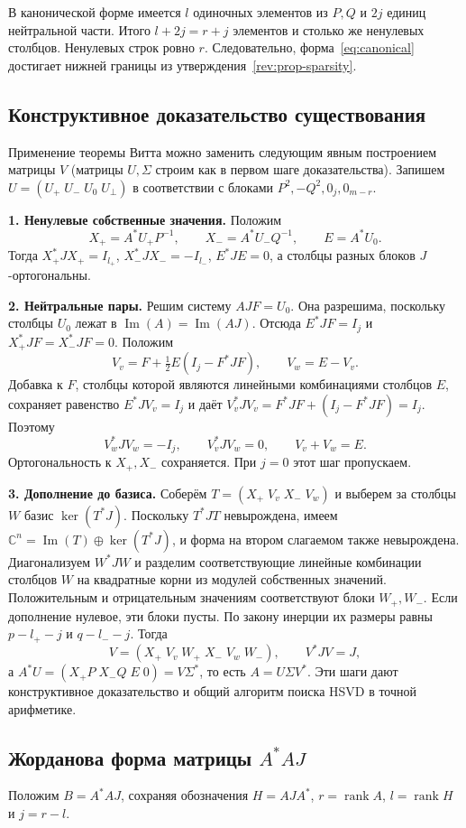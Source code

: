 \documentclass[a4paper,12pt]{article}
\DeclareMathOperator{\rank}{rank}
\theoremstyle{csstyle}
\DeclareMathOperator{\im}{Im}
\newcommand{\HSVDComplex}{\mathbb C}
\begin{document}
В канонической форме имеется $l$ одиночных элементов из $P,Q$ и $2j$
единиц нейтральной части. Итого $l+2j=r+j$ элементов и столько же
ненулевых столбцов. Ненулевых строк ровно $r$.
Следовательно, форма~\eqref{eq:canonical} достигает нижней границы
из утверждения~\ref{rev:prop-sparsity}.

\subsection{Конструктивное доказательство существования}
\label{sec:existence-constructive}

Применение теоремы Витта можно заменить следующим явным построением матрицы $V$ (матрицы $U,\Sigma$ строим как в первом шаге доказательства).
Запишем $U=(U_+\;U_-\;U_0\;U_\perp)$ в соответствии с блоками
$P^2,-Q^2,0_j,0_{m-r}$.

\textbf{1. Ненулевые собственные значения.} Положим
\[
X_+=A^*U_+P^{-1},\qquad X_-=A^*U_-Q^{-1},\qquad E=A^*U_0.
\]
Тогда $X_+^*JX_+=I_{l_+}$, $X_-^*JX_-=-I_{l_-}$,
$E^*JE=0$, а столбцы разных блоков $J$-ортогональны.

\textbf{2. Нейтральные пары.} Решим систему $AJF=U_0$.
Она разрешима, поскольку столбцы $U_0$ лежат в $\im(A)=\im(AJ)$.
Отсюда $E^*JF=I_j$ и $X_+^*JF=X_-^*JF=0$. Положим
\[
V_v=F+\tfrac12E(I_j-F^*JF),\qquad V_w=E-V_v.
\]
Добавка к $F$, столбцы которой являются линейными комбинациями столбцов $E$,
сохраняет равенство $E^*JV_v=I_j$
и даёт $V_v^*JV_v=F^*JF+(I_j-F^*JF)=I_j$. Поэтому
\[
V_w^*JV_w=-I_j,\qquad V_v^*JV_w=0,\qquad V_v+V_w=E.
\]
Ортогональность к $X_+,X_-$ сохраняется. При $j=0$ этот шаг пропускаем.

\textbf{3. Дополнение до базиса.} Соберём
$T=(X_+\;V_v\;X_-\;V_w)$ и выберем за столбцы $W$ базис
$\ker(T^*J)$. Поскольку $T^*JT$ невырождена, имеем
$\HSVDComplex^n=\im(T)\oplus\ker(T^*J)$, и форма на втором слагаемом
также невырождена. Диагонализуем $W^*JW$ и разделим соответствующие
линейные комбинации столбцов $W$ на квадратные корни из модулей
собственных значений. Положительным и отрицательным значениям
соответствуют блоки $W_+,W_-$.
Если дополнение нулевое, эти блоки пусты.
По закону инерции их размеры равны $p-l_+-j$ и $q-l_--j$.
Тогда
\[
V=(X_+\;V_v\;W_+\;X_-\;V_w\;W_-),\qquad V^*JV=J,
\]
а $A^*U=(X_+P\;X_-Q\;E\;0)=V\Sigma^*$, то есть
$A=U\Sigma V^*$.
Эти шаги дают конструктивное доказательство и общий алгоритм поиска HSVD в точной арифметике.

\subsection{Жорданова форма матрицы $A^*AJ$}
\label{rev:subsec-jordan}
Положим $B=A^*AJ$, сохраняя обозначения
$H=AJA^*$, $r=\rank A$, $l=\rank H$ и $j=r-l$.
\end{document}
